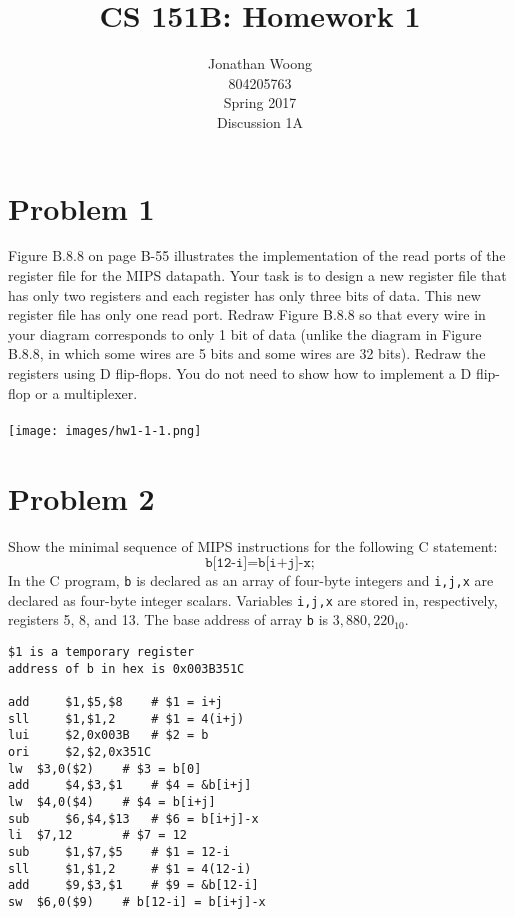 \documentclass[10pt,letterpaper]{article}
\date{\displaydate{date}}
\begin{document}
\title{CS 151B: Homework 1}
\author{
	Jonathan Woong\\
	804205763\\
	Spring 2017\\
	Discussion 1A}
\maketitle
\pagebreak


\section{Problem 1}
Figure B.8.8 on page B-55 illustrates the implementation of the read ports of the register file for the MIPS datapath. Your task is to design a new register file that has only two registers and each register has only three bits of data. This new register file has only one read port. Redraw Figure B.8.8 so that every wire in your diagram corresponds to only 1 bit of data (unlike the diagram in Figure B.8.8, in which some wires are 5 bits and some wires are 32 bits). Redraw the registers using D flip-flops. You do not need to show how to implement a D flip-flop or a multiplexer.\\\\
\texttt{[image: images/hw1-1-1.png]}\\
\pagebreak


\section{Problem 2}
Show the minimal sequence of MIPS instructions for the following C statement:
\[\texttt{b[12-i]=b[i+j]-x;}\]
In the C program, \texttt{b} is declared as an array of four-byte integers and \texttt{i,j,x} are declared as four-byte integer scalars. Variables \texttt{i,j,x} are stored in, respectively, registers 5, 8, and 13. The base address of array \texttt{b} is $3,880,220_{10}$.\\
\begin{lstlisting}
$1 is a temporary register
address of b in hex is 0x003B351C

add 	$1,$5,$8 	# $1 = i+j
sll 	$1,$1,2  	# $1 = 4(i+j)
lui 	$2,0x003B 	# $2 = b
ori 	$2,$2,0x351C
lw 	$3,0($2) 	# $3 = b[0]
add 	$4,$3,$1 	# $4 = &b[i+j]
lw 	$4,0($4) 	# $4 = b[i+j]
sub 	$6,$4,$13 	# $6 = b[i+j]-x
li 	$7,12 		# $7 = 12
sub 	$1,$7,$5 	# $1 = 12-i
sll 	$1,$1,2 	# $1 = 4(12-i)
add 	$9,$3,$1 	# $9 = &b[12-i]
sw 	$6,0($9) 	# b[12-i] = b[i+j]-x
\end{lstlisting}
\pagebreak
\end{document}
